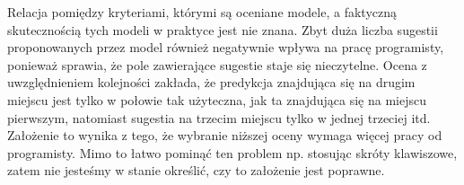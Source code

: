Relacja pomiędzy kryteriami, którymi są oceniane modele, a faktyczną skutecznością tych modeli w praktyce jest nie znana. Zbyt duża liczba 
sugestii proponowanych przez model również negatywnie wpływa na pracę programisty, ponieważ sprawia, że pole zawierające sugestie staje 
się nieczytelne. Ocena z uwzględnieniem kolejności zakłada, że predykcja znajdująca się na drugim miejscu jest tylko w połowie tak użyteczna, 
jak ta znajdująca się na miejscu pierwszym, natomiast sugestia na trzecim miejscu tylko w jednej trzeciej itd. Założenie to wynika z tego, że 
wybranie niższej oceny wymaga więcej pracy od programisty. Mimo to łatwo pominąć ten problem np. stosując skróty klawiszowe, zatem 
nie jesteśmy w stanie określić, czy to założenie jest poprawne. 





